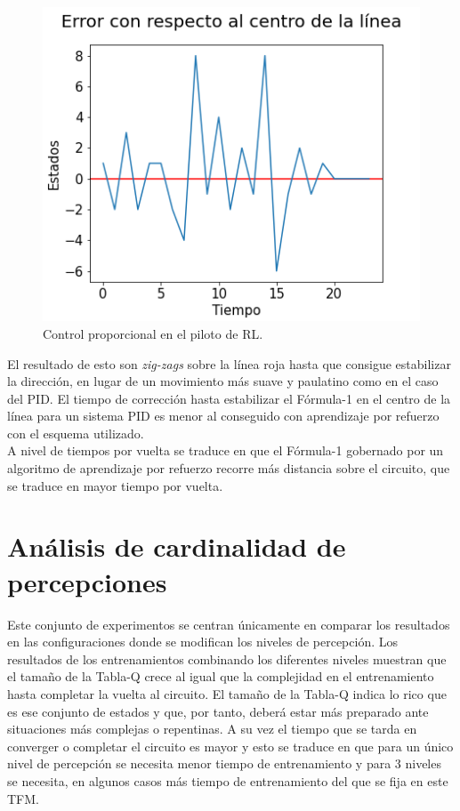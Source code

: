 \begin{figure}[ht!]
    \centering \includegraphics[width=0.5\columnwidth]{./figures/chapter_5/p_control.png}
    \caption{Control proporcional en el piloto de RL.}\label{fig:p_control}
\end{figure}

El resultado de esto son \textit{zig-zags} sobre la línea roja hasta que consigue estabilizar la dirección, en lugar de un movimiento más suave y paulatino como en el caso del PID. El tiempo de corrección hasta estabilizar el Fórmula-1 en el centro de la línea para un sistema PID es menor al conseguido con aprendizaje por refuerzo con el esquema utilizado.\\

A nivel de tiempos por vuelta se traduce en que el Fórmula-1 gobernado por un algoritmo de aprendizaje por refuerzo recorre más distancia sobre el circuito, que se traduce en mayor tiempo por vuelta.


\section{Análisis de cardinalidad de percepciones}

Este conjunto de experimentos se centran únicamente en comparar los resultados en las configuraciones donde se modifican los niveles de percepción. Los resultados de los entrenamientos combinando los diferentes niveles muestran que el tamaño de la Tabla-Q crece al igual que la complejidad en el entrenamiento hasta completar la vuelta al circuito. El tamaño de la Tabla-Q indica lo rico que es ese conjunto de estados y que, por tanto, deberá estar más preparado ante situaciones más complejas o repentinas. A su vez el tiempo que se tarda en converger o completar el circuito es mayor y esto se traduce en que para un único nivel de percepción se necesita menor tiempo de entrenamiento y para 3 niveles se necesita, en algunos casos más tiempo de entrenamiento del que se fija en este TFM.\\

